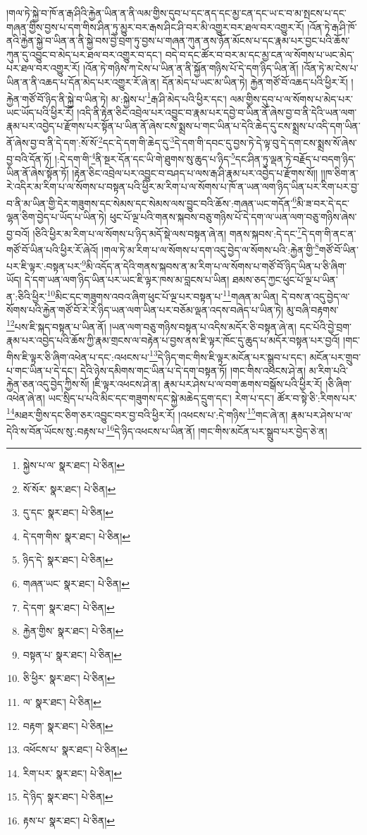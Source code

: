 །གལ་ཏེ་སྐྱེ་བ་ཁོ་ན་རྒ་ཤིའི་རྐྱེན་ཡིན་ན་ནི་ལམ་གྱིས་དུབ་པ་དང་ནད་དང་མྱ་ངན་དང་ཡ་ང་བ་མ་སྤངས་པ་དང་གཞན་གྱིས་བྱས་པ་དག་གིས་ཤིན་ཏུ་མྱུར་བར་རྒས་ཤིང་ཤི་བར་མི་འགྱུར་བར་ཐལ་བར་འགྱུར་རོ། །འོན་ཏེ་རྒ་ཤི་ཁོ་ནའི་རྐྱེན་སྐྱེ་བ་ཡིན་ན་ནི་སྐྱེ་བས་བྱེ་བྲག་ཏུ་བྱས་པ་གཞན་ཀུན་ནས་ཉོན་མོངས་པ་དང་རྣམ་པར་བྱང་པའི་ཆོས་ཀུན་དུ་འབྱུང་བ་མེད་པར་ཐལ་བར་འགྱུར་བ་དང་། བདེ་བ་དང་ཚོར་བ་བར་མ་དང་མྱ་ངན་ལ་སོགས་པ་ཡང་མེད་པར་ཐལ་བར་འགྱུར་རོ། །འོན་ཏེ་གཉིས་ཀ་ངེས་པ་ཡིན་ན་ནི་སྐྱོན་གཉིས་པོ་དེ་དག་ཉིད་ཡིན་ནོ། །འོན་ཏེ་མ་ངེས་པ་ཡིན་ན་ནི་འཆད་པ་དོན་མེད་པར་འགྱུར་རོ་ཞེ་ན། དོན་མེད་པ་ཡང་མ་ཡིན་ཏེ། རྐྱེན་གཙོ་བོ་འཆད་པའི་ཕྱིར་རོ། །རྐྱེན་གཙོ་བོ་ཉིད་ནི་སྐྱེ་བ་ཡིན་ཏེ། མ་:སྐྱེས་པ་\footnote{སྐྱེས་པ་ལ་  སྣར་ཐང་།  པེ་ཅིན། }རྒ་ཤི་མེད་པའི་ཕྱིར་དང་། ལམ་གྱིས་དུབ་པ་ལ་སོགས་པ་མེད་པར་ཡང་ཡོད་པའི་ཕྱིར་རོ། །འདི་ནི་རྟེན་ཅིང་འབྲེལ་པར་འབྱུང་བ་རྣམ་པར་དབྱེ་བ་ཡིན་ནོ་ཞེས་བྱ་བ་ནི་དེའི་ཡན་ལག་རྣམ་པར་འབྱེད་པ་རྫོགས་པར་སྟོན་པ་ཡིན་ནོ་ཞེས་ངས་སྨྲས་པ་གང་ཡིན་པ་དེའི་ཆེད་དུ་ངས་སྨྲས་པ་འདི་དག་ཡིན་ནོ་ཞེས་བྱ་བ་ནི་དེ་དག་:སོ་སོ་\footnote{སོ་སོར་  སྣར་ཐང་།  པེ་ཅིན། }དང་དེ་དག་གི་ཆེད་དུ་\footnote{དུ་དང་  སྣར་ཐང་།  པེ་ཅིན། }དེ་དག་གི་དབང་དུ་བྱས་ཏེ་དེ་ལྟ་བུ་དེ་དག་ངས་སྨྲས་སོ་ཞེས་བྱ་བའི་དོན་ཏོ། །:དེ་དག་གི་\footnote{དེ་དག་གིས་  སྣར་ཐང་།  པེ་ཅིན། }ནི་སྔར་དོན་དང་ཡི་གེ་ཐུགས་སུ་ཆུད་པ་ཉིད་\footnote{ཉིད་དེ་  སྣར་ཐང་།  པེ་ཅིན། }དང་ཤིན་ཏུ་ལྡན་ཏེ་བརྗོད་པ་བདག་ཉིད་ཡིན་ནོ་ཞེས་སྟོན་ཏོ། །རྟེན་ཅིང་འབྲེལ་པར་འབྱུང་བ་བཤད་པ་ལས་རྒ་ཤི་རྣམ་པར་འབྱེད་པ་རྫོགས་སོ།། །།ཁ་ཅིག་ན་རེ་འདིར་མ་རིག་པ་ལ་སོགས་པ་བསྟན་པའི་ཕྱིར་མ་རིག་པ་ལ་སོགས་པ་ཁོ་ན་ཡན་ལག་ཉིད་ཡིན་པར་རིག་པར་བྱ་བ་ནི་མ་ཡིན་གྱི་དེར་གཟུགས་དང་སེམས་དང་སེམས་ལས་བྱུང་བའི་ཆོས་:གཞན་ཡང་གདོན་\footnote{གཞན་ཡང་  སྣར་ཐང་།  པེ་ཅིན། }མི་ཟ་བར་དེ་དང་ལྷན་ཅིག་བྱེད་པ་ཡོད་པ་ཡིན་ཏེ། ཕུང་པོ་ལྔ་པའི་གནས་སྐབས་བཅུ་གཉིས་པོ་དེ་དག་ལ་ཡན་ལག་བཅུ་གཉིས་ཞེས་བྱ་བའོ། །ཅིའི་ཕྱིར་མ་རིག་པ་ལ་སོགས་པ་ཉིད་མདོ་སྡེ་ལས་བསྟན་ཞེ་ན། གནས་སྐབས་:དེ་དང་\footnote{དེ་དག་  སྣར་ཐང་།  པེ་ཅིན། }དེ་དག་གི་ནང་ན་གཙོ་བོ་ཡིན་པའི་ཕྱིར་རོ་ཞེའོ། །གལ་ཏེ་མ་རིག་པ་ལ་སོགས་པ་དག་འདུ་བྱེད་ལ་སོགས་པའི་:རྐྱེན་གྱི་\footnote{རྐྱེན་གྱིས་  སྣར་ཐང་།  པེ་ཅིན། }གཙོ་བོ་ཡིན་པར་ཇི་ལྟར་:བསྟན་པར་\footnote{བསྟན་པ་  སྣར་ཐང་།  པེ་ཅིན། }མི་འདོད་ན་དེའི་གནས་སྐབས་ན་མ་རིག་པ་ལ་སོགས་པ་གཙོ་བོ་ཉིད་ཡིན་པ་ཅི་ཞིག་ཡོད། དེ་དག་ཡན་ལག་ཉིད་ཡིན་པར་ཡང་ཇི་ལྟར་ཁས་མ་བླངས་པ་ཡིན། ཐམས་ཅད་ཀྱང་ཕུང་པོ་ལྔ་པ་ཡིན་ན་:ཅིའི་ཕྱིར་\footnote{ཅི་ཕྱིར་  སྣར་ཐང་།  པེ་ཅིན། }མིང་དང་གཟུགས་འབའ་ཞིག་ཕུང་པོ་ལྔ་པར་བསྟན་པ་\footnote{ལ་  སྣར་ཐང་།  པེ་ཅིན། }གཞན་མ་ཡིན། དེ་བས་ན་འདུ་བྱེད་ལ་སོགས་པའི་རྐྱེན་གཙོ་བོ་རེ་རེ་ཉིད་ཡན་ལག་ཡིན་པར་བཅོམ་ལྡན་འདས་བཞེད་པ་ཡིན་ཏེ། མུ་བཞི་བརྟགས་\footnote{བརྟག་  སྣར་ཐང་།  པེ་ཅིན། }པས་ཇི་སྐད་བསྟན་པ་ཡིན་ནོ། །ཡན་ལག་བཅུ་གཉིས་བསྟན་པ་འདིས་མདོར་ཅི་བསྟན་ཞེ་ན། དང་པོའི་བྱེ་བྲག་རྣམ་པར་འབྱེད་པའི་ཆོས་ཀྱི་རྣམ་གྲངས་ལ་བརྟེན་པ་བྱས་ནས་ཇི་ལྟར་ཁོང་དུ་ཆུད་པ་མདོར་བསྟན་པར་བྱའོ། །གང་གིས་ཇི་ལྟར་ཅི་ཞིག་འཕེན་པ་དང་:འཕངས་པ་\footnote{འཕོངས་པ་  སྣར་ཐང་།  པེ་ཅིན། }དེ་ཉིད་གང་གིས་ཇི་ལྟར་མངོན་པར་སྒྲུབ་པ་དང་། མངོན་པར་གྲུབ་པ་གང་ཡིན་པ་དེ་དང་། དེའི་ཉེས་དམིགས་གང་ཡིན་པ་དེ་དག་བསྟན་ཏོ། །གང་གིས་འཕངས་ཤེ་ན། མ་རིག་པའི་རྐྱེན་ཅན་འདུ་བྱེད་ཀྱིས་སོ། །ཇི་ལྟར་འཕངས་ཤེ་ན། རྣམ་པར་ཤེས་པ་ལ་བག་ཆགས་བསྒོས་པའི་ཕྱིར་རོ། །ཅི་ཞིག་འཕེན་ཞེ་ན། ཡང་སྲིད་པ་པའི་མིང་དང་གཟུགས་དང་སྐྱེ་མཆེད་དྲུག་དང་། རེག་པ་དང་། ཚོར་བ་སྟེ་ཅི་:རིགས་པར་\footnote{རིག་པར་  སྣར་ཐང་།  པེ་ཅིན། }མཐར་གྱིས་དང་ཅིག་ཅར་འབྱུང་བར་བྱ་བའི་ཕྱིར་རོ། །འཕངས་པ་:དེ་གཉིས་\footnote{དེ་ཉིད་  སྣར་ཐང་།  པེ་ཅིན། }གང་ཞེ་ན། རྣམ་པར་ཤེས་པ་ལ་དེའི་ས་བོན་ཡོངས་སུ་:བརྟས་པ་\footnote{རྟས་པ་  སྣར་ཐང་།  པེ་ཅིན། }དེ་ཉིད་འཕངས་པ་ཡིན་ནོ། །གང་གིས་མངོན་པར་སྒྲུབ་པར་བྱེད་ཅེ་ན། 